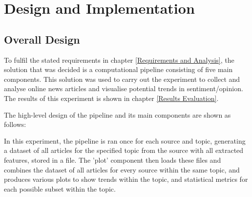 \documentclass{report}
\begin{document}


\chapter{Design and Implementation} \label{Design and Implementation} %

\section{Overall Design} \label{Overall Design}

To fulfil the stated requirements in chapter \ref{Requirements and Analysis}, the solution that was decided is a computational pipeline consisting of five main components.
This solution was used to carry out the experiment to collect and analyse online news articles and visualise potential trends in sentiment/opinion.
The results of this experiment is shown in chapter \ref{Results Evaluation}.

The high-level design of the pipeline and its main components are shown as follows:

In this experiment, the pipeline is ran once for each source and topic, generating a dataset of all articles for the specified topic from the source with all extracted features, stored in a file.
The 'plot' component then loads these files and combines the dataset of all articles for every source within the same topic, and produces various plots to show trends within the topic, and statistical metrics for each possible subset within the topic.
\end{document}
